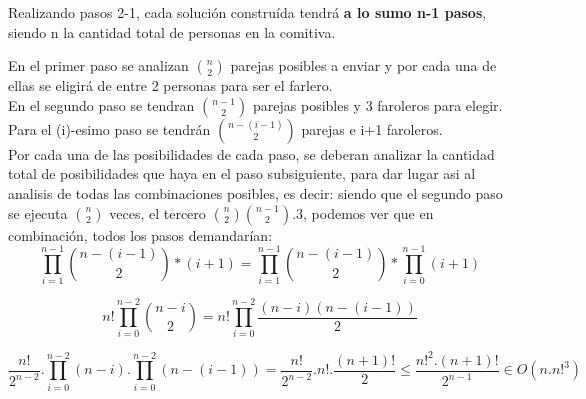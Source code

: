 \vspace*{1em}

Realizando pasos 2-1, cada solución construída tendrá {\bf a lo sumo n-1 pasos}, siendo n la cantidad total de personas en la comitiva.

En el primer paso se analizan $\binom {n}{2}$ parejas posibles a enviar y por cada una de ellas se eligirá de entre 2 personas para ser el farlero.\\

En el segundo paso se tendran $\binom {n-1}{2}$ parejas posibles y 3 faroleros para elegir.\\

Para el (i)-esimo paso se tendrán $\binom {n-(i-1)}{2}$ parejas e i+1 faroleros.\\

Por cada una de las posibilidades de cada paso, se deberan analizar la cantidad total de posibilidades que haya en el paso subsiguiente, para dar lugar asi al analisis de todas las combinaciones posibles, es decir: siendo que el segundo paso se ejecuta $\binom {n}{2}$ veces, el tercero $\binom {n}{2} \binom{n-1} {2}.3$, podemos ver que en combinación, todos los pasos demandarían:
\[
\prod_{i=1}^{n-1}\binom {n-(i-1)}{2}*(i+1) = \prod_{i=1}^{n-1}\binom {n-(i-1)}{2} * \prod_{i=0}^{n-1}(i+1)
\]

\[
n!\prod_{i=0}^{n-2}\binom {n-i}{2} = n!\prod_{i=0}^{n-2}\frac{(n-i)(n-(i-1))}{2}
\]

\[
\frac{ n!}{2^{n-2}}.\prod_{i=0}^{n-2}(n-i).\prod_{i=0}^{n-2}(n-(i-1)) = \frac{n!}{2^{n-2}}.n!.\frac{(n+1)!}{2}\leq \frac{n!^{2}.(n+1)!}{2^{n-1}}\in O(n.n!^{3})
\]